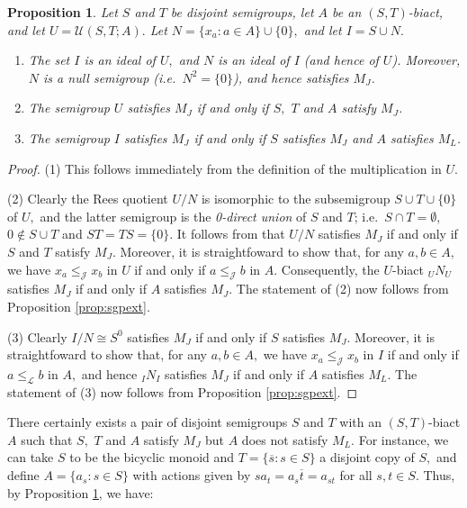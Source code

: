 \documentclass[twoside,a4paper,12pt,reqno]{amsart}
\theoremstyle{plain}
\newtheorem{prop}[thm]{Proposition}
\theoremstyle{definition}
\newcommand{\leql}{\leq_{\mathcal{L}}}
\newcommand{\leqj}{\leq_{\mathcal{J}}}
\newcommand{\U}{\mathcal{U}}
\newcommand{\ol}{\overline}
\begin{document}
\begin{prop}\label{prop:S,T;A}
Let $S$ and $T$ be disjoint semigroups, let $A$ be an $(S,T)$-biact, and let $U=\U(S,T;A).$  Let $N=\{x_a : a\in A\}\cup\{0\},$ and let $I=S\cup N.$
\begin{enumerate}[leftmargin=*]
\item The set $I$ is an ideal of $U,$ and $N$ is an ideal of $I$ (and hence of $U$).  Moreover, $N$ is a null semigroup (i.e.\ $N^2=\{0\}$), and hence satisfies $M_J$.
\item The semigroup $U$ satisfies $M_J$ if and only if $S,$ $T$ and $A$ satisfy $M_J$.
\item The semigroup $I$ satisfies $M_J$ if and only if $S$ satisfies $M_J$ and $A$ satisfies $M_L$.
\end{enumerate}
\end{prop}

\begin{proof}
(1) This follows immediately from the definition of the multiplication in $U.$

(2)  Clearly the Rees quotient $U/N$ is isomorphic to the subsemigroup $S\cup T\cup\{0\}$ of $U,$ and the latter semigroup is the {\em 0-direct union} of $S$ and $T$; i.e.\ $S\cap T=\emptyset,$ $0\notin S\cup T$ and $ST=TS=\{0\}.$  It follows from \cite[Lemma 1.4]{Hall} that $U/N$ satisfies $M_J$ if and only if $S$ and $T$ satisfy $M_J$.  Moreover, it is straightfoward to show that, for any $a,b\in A,$ we have $x_a\leqj x_b$ in $U$ if and only if $a\leqj b$ in $A.$  Consequently, the $U$-biact ${_U}N_U$ satisfies $M_J$ if and only if $A$ satisfies $M_J$.  The statement of (2) now follows from Proposition \ref{prop:sgpext}.

(3) Clearly $I/N\cong S^0$ satisfies $M_J$ if and only if $S$ satisfies $M_J$.  Moreover, it is straightfoward to show that, for any $a,b\in A,$ we have $x_a\leqj x_b$ in $I$ if and only if $a\leql b$ in $A,$ and hence ${_I}N_I$ satisfies $M_J$ if and only if $A$ satisfies $M_L$.  The statement of (3) now follows from Proposition \ref{prop:sgpext}. 
\end{proof}

There certainly exists a pair of disjoint semigroups $S$ and $T$ with an $(S,T)$-biact $A$ such that $S,$ $T$ and $A$ satisfy $M_J$ but $A$ does not satisfy $M_L$.  For instance, we can take $S$ to be the bicyclic monoid and $T=\{\ol{s} : s\in S\}$ a disjoint copy of $S,$ and define $A=\{a_s : s\in S\}$ with actions given by $sa_t=a_s\ol{t}=a_{st}$ for all $s,t\in S.$  Thus, by Proposition \ref{prop:S,T;A}, we have:
\end{document}

